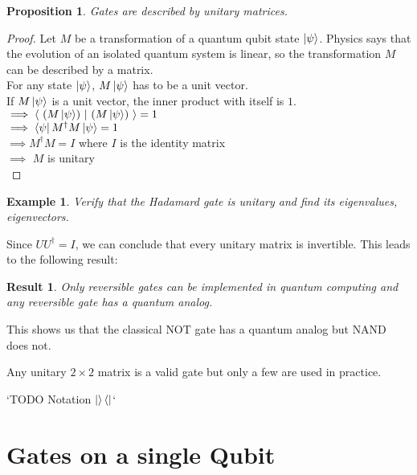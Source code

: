 \documentclass[12pt,twoside]{report}
\theoremstyle{thmstyle}
\newtheorem{eg}[subsection]{Example}
\newtheorem{result}[subsection]{Result}
\newtheorem{prop}[subsection]{Proposition}
\begin{document}
\begin{prop}
Gates are described by unitary matrices.
\end{prop}
\begin{proof}
    Let $M$ be a transformation of a quantum qubit state $\ket{\psi}$. Physics says that the evolution of an isolated quantum system is linear, so the transformation $M$ can be described by a matrix. \\

    For any state $\ket{\psi}$, $M \ket{\psi}$ has to be a unit vector. \\
    If $M \ket{\psi}$ is a unit vector, the inner product with itself is $1$.\\
    $\implies \braket{ \ (M\ket{\psi}) \ |\  (M \ket{\psi}) \ } = 1$\\
    $\implies \bra{\psi} M^\dagger M \ket{\psi} = 1$ \\
    $\implies M^\dagger M = I$ where $I$ is the identity matrix\\
    $\implies$ $M$ is unitary\\
\end{proof}

\begin{eg}
    Verify that the Hadamard gate is unitary and find its eigenvalues, eigenvectors.
\end{eg}

Since $U U^\dagger = I$, we can conclude that every unitary matrix is invertible.
This leads to the following result:
\begin{result}
    Only reversible gates can be implemented in quantum computing and any reversible gate has a quantum analog.
\end{result}

This shows us that the classical $\text{NOT}$ gate has a quantum analog but $\text{NAND}$ does not.

Any unitary $2 \times 2$ matrix is a valid gate but only a few are used in practice.


`TODO Notation $\ket{}\bra{}$`
\section{Gates on a single Qubit}
\end{document}
